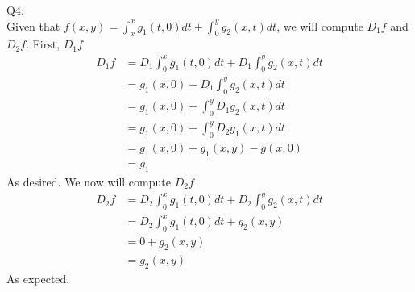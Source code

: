 \documentclass[letterpaper]{article}
\begin{document}
Q4:\\
Given that $f(x,y) = \int_x^x g_1(t,0)dt + \int_0^y g_2(x,t)dt$, we will compute $D_1f$ and $D_2f$. First, $D_1f$
\begin{align*}
    D_1f & = D_1\int_0^x g_1(t,0)dt + D_1 \int_0^y g_2(x,t)dt
    \\ & = g_1(x,0) + D_1 \int_0^y g_2(x,t)dt \tag{by FTC}
    \\ & = g_1(x,0) + \int_0^y D_1 g_2(x,t)dt \tag{by the Leibniz Rule}
    \\ & = g_1(x,0) + \int_0^y D_2 g_1(x,t)dt \tag{by assumption}
    \\ & = g_1(x,0) + g_1(x,y) - g(x,0) \tag{by FTC}
    \\ & = g_1
\end{align*} As desired. We now will compute $D_2f$
\begin{align*}
    D_2 f & = D_2 \int_0^x g_1(t,0)dt + D_2 \int_0^y g_2(x,t)dt 
    \\ & = D_2 \int_0^x g_1(t,0)dt + g_2(x,y) \tag{by FTC}
    \\ & = 0 +  g_2(x,y) \tag{since first integral contstant in y}
    \\ & = g_2(x,y)
\end{align*} As expected.
\end{document}
